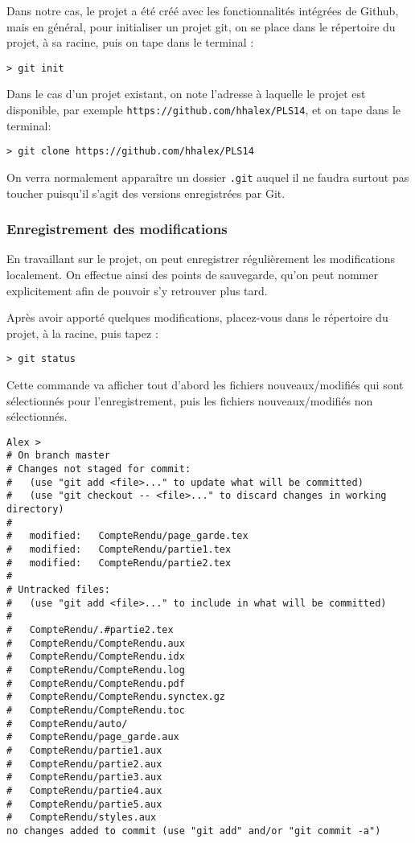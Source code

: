 \par Dans notre cas, le projet a été créé avec les fonctionnalités intégrées de Github, mais en général, pour initialiser un projet git, on se place dans le répertoire du projet, à sa racine, puis on tape dans le terminal :
\begin{verbatim}
> git init
\end{verbatim}

\par Dans le cas d'un projet existant, on note l'adresse à laquelle le projet est disponible, par exemple \texttt{https://github.com/hhalex/PLS14}, et on tape dans le terminal:
\begin{verbatim}
> git clone https://github.com/hhalex/PLS14
\end{verbatim}

\par On verra normalement apparaître un dossier \texttt{.git} auquel il ne faudra surtout pas toucher puisqu'il s'agit des versions enregistrées par Git.

\subsubsection{Enregistrement des modifications}
\label{sec:enreg-des-modif}

\par En travaillant sur le projet, on peut enregistrer régulièrement les modifications localement. On effectue ainsi des points de sauvegarde, qu'on peut nommer explicitement afin de pouvoir s'y retrouver plus tard.
\par Après avoir apporté quelques modifications, placez-vous dans le répertoire du projet, à la racine, puis tapez :
\begin{verbatim}
> git status
\end{verbatim}
 \par Cette commande va afficher tout d'abord les fichiers nouveaux/modifiés qui sont sélectionnés pour l'enregistrement, puis les fichiers nouveaux/modifiés non sélectionnés. 

\begin{verbatim}
Alex > 
# On branch master
# Changes not staged for commit:
#   (use "git add <file>..." to update what will be committed)
#   (use "git checkout -- <file>..." to discard changes in working directory)
#
#	modified:   CompteRendu/page_garde.tex
#	modified:   CompteRendu/partie1.tex
#	modified:   CompteRendu/partie2.tex
#
# Untracked files:
#   (use "git add <file>..." to include in what will be committed)
#
#	CompteRendu/.#partie2.tex
#	CompteRendu/CompteRendu.aux
#	CompteRendu/CompteRendu.idx
#	CompteRendu/CompteRendu.log
#	CompteRendu/CompteRendu.pdf
#	CompteRendu/CompteRendu.synctex.gz
#	CompteRendu/CompteRendu.toc
#	CompteRendu/auto/
#	CompteRendu/page_garde.aux
#	CompteRendu/partie1.aux
#	CompteRendu/partie2.aux
#	CompteRendu/partie3.aux
#	CompteRendu/partie4.aux
#	CompteRendu/partie5.aux
#	CompteRendu/styles.aux
no changes added to commit (use "git add" and/or "git commit -a")
\end{verbatim}


